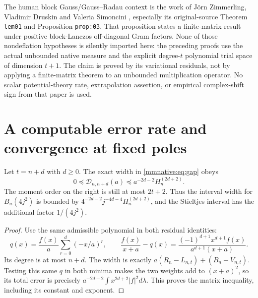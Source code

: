 \documentclass[11pt]{article}
\begin{document}
The human block Gauss/Gauss--Radau context is the work of J\"orn
Zimmerling, Vladimir Druskin and Valeria Simoncini \cite{mmnative:ZDS},
especially its original-source Theorem \texttt{lem01} and Proposition
\texttt{prop:03}.  That proposition states a finite-matrix result
under positive block-Lanczos off-diagonal Gram factors.  None of those
nondeflation hypotheses is silently imported here: the preceding
proofs use the actual unbounded native measure and the explicit
degree-$t$ polynomial trial space of dimension $t+1$.  The claim is
proved by its variational residuals, not by applying a finite-matrix
theorem to an unbounded multiplication operator.  No scalar
potential-theory rate, extrapolation assertion, or empirical
complex-shift sign from that paper is used.

\section{A computable error rate and convergence at fixed poles}

\begin{mmnativetheorem}\label{mmnative:thm:rate}
Let $t=n+d$ with $d\ge0$.  The exact width in \eqref{mmnative:eq:gap} obeys
\begin{equation}\label{mmnative:eq:rate}
 \boxed{0\preceq\mathcal D_{n,n+d}(a)
 \preceq a^{-2d-2}H_n^{(2d+2)}.}
\end{equation}
The moment order on the right is still at most $2t+2$.
Thus the interval width for $B_n(4j^2)$ is bounded by
$4^{-2d-2}j^{-4d-4}H_n^{(2d+2)}$, and the Stieltjes interval has
the additional factor $1/(4j^2)$.
\end{mmnativetheorem}
\begin{proof}
Use the same admissible polynomial in both residual identities:
\[
 q(x)=\frac{f(x)}a\sum_{r=0}^d(-x/a)^r,
 \qquad\frac{f(x)}{x+a}-q(x)
 =\frac{(-1)^{d+1}x^{d+1}f(x)}{a^{d+1}(x+a)}.
\]
Its degree is at most $n+d$.  The width is exactly
$a(R_n-L_{n,t})+(B_n-V_{n,t})$.  Testing this same $q$ in both
minima makes the two weights add to $(x+a)^2$, so its total error
is precisely
$a^{-2d-2}\int x^{2d+2}|f|^2d\lambda$.  This proves the matrix
inequality, including its constant and exponent.
\end{proof}
\end{document}
